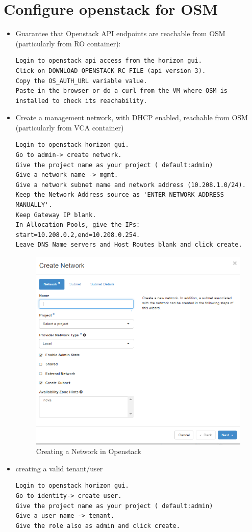 \section{Configure openstack for OSM}
\begin{itemize}
\item Guarantee that Openstack API endpoints are reachable from OSM (particularly from RO container):
\begin{lstlisting}
Login to openstack api access from the horizon gui.
Click on DOWNLOAD OPENSTACK RC FILE (api version 3).
Copy the OS_AUTH_URL variable value.
Paste in the browser or do a curl from the VM where OSM is installed to check its reachability. 
\end{lstlisting}
\item Create a management network, with DHCP enabled, reachable from OSM (particularly from VCA container)
\begin{lstlisting}
Login to openstack horizon gui.
Go to admin-> create network.
Give the project name as your project ( default:admin)
Give a network name -> mgmt.
Give a network subnet name and network address (10.208.1.0/24). 
Keep the Network Address source as 'ENTER NETWORK ADDRESS MANUALLY'.
Keep Gateway IP blank.
In Allocation Pools, give the IPs:  start=10.208.0.2,end=10.208.0.254.
Leave DNS Name servers and Host Routes blank and click create.
\end{lstlisting}
\begin{figure}[H]
	\centering
	\includegraphics[width=0.5\linewidth]{figures/sh11}
	\caption{Creating a Network in Openstack}
\end{figure}
\item creating a valid tenant/user
\begin{lstlisting}
Login to openstack horizon gui.
Go to identity-> create user.
Give the project name as your project ( default:admin)
Give a user name -> tenant.
Give the role also as admin and click create.
\end{lstlisting}

\end{itemize}
